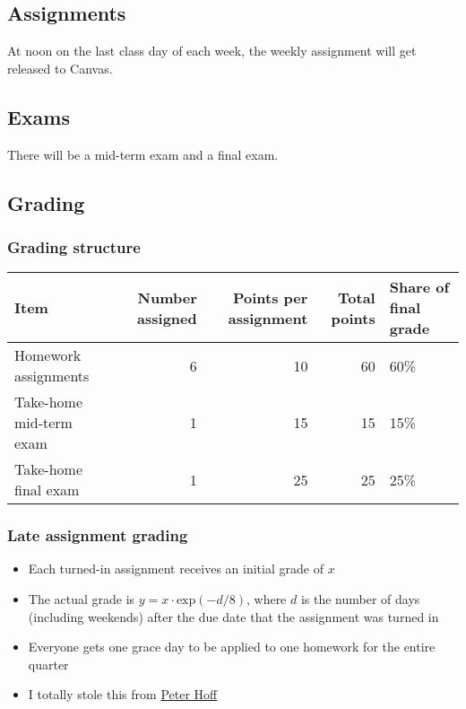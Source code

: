\documentclass[
]{book}
\providecommand{\tightlist}{%
  \setlength{\itemsep}{0pt}\setlength{\parskip}{0pt}}
\begin{document}
\hypertarget{assignments}{%
\subsection*{Assignments}\label{assignments}}

At noon on the last class day of each week, the weekly assignment will get released to Canvas.

\hypertarget{exams}{%
\subsection*{Exams}\label{exams}}

There will be a mid-term exam and a final exam.

\hypertarget{grading}{%
\subsection*{Grading}\label{grading}}

\hypertarget{grading-structure}{%
\subsubsection*{Grading structure}\label{grading-structure}}

\begin{tabular}{l|r|r|r|l}
\hline
Item & Number assigned & Points per assignment & Total points & Share of final grade\\
\hline
Homework assignments & 6 & 10 & 60 & 60\%\\
\hline
Take-home mid-term exam & 1 & 15 & 15 & 15\%\\
\hline
Take-home final exam & 1 & 25 & 25 & 25\%\\
\hline
\end{tabular}

\hypertarget{late-assignment-grading}{%
\subsubsection*{Late assignment grading}\label{late-assignment-grading}}

\begin{itemize}
\tightlist
\item
  Each turned-in assignment receives an initial grade of \(x\)
\item
  The actual grade is \(y = x \cdot \text{exp}(-d/8)\), where \(d\) is the number of days (including weekends) after the due date that the assignment was turned in
\item
  Everyone gets one grace day to be applied to one homework for the entire quarter
\item
  I totally stole this from \href{https://pdhoff.github.io/}{Peter Hoff}
\end{itemize}
\end{document}
